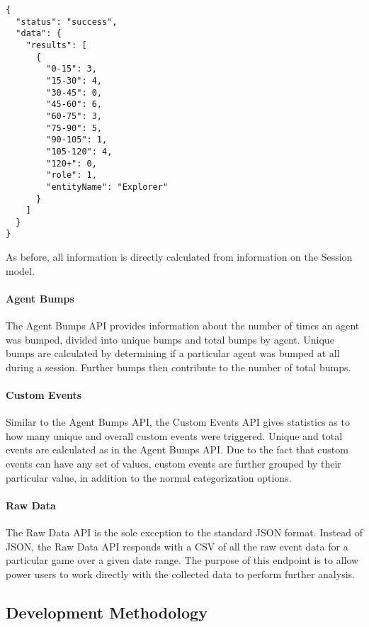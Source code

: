 \medskip
\begin{lstlisting}[caption=Gameplay Duration API response{,} showing the number of sessions that fell within certain ranges of gameplay time{,} categorized by the Explorer role, label={lst:duration_response}]
{
  "status": "success",
  "data": {
    "results": [
      {
        "0-15": 3,
        "15-30": 4,
        "30-45": 0,
        "45-60": 6,
        "60-75": 3,
        "75-90": 5,
        "90-105": 1,
        "105-120": 4,
        "120+": 0,
        "role": 1,
        "entityName": "Explorer"
      }
    ]
  }
}
\end{lstlisting}

As before, all information is directly calculated from information on the Session model.

\paragraph{Agent Bumps}

The Agent Bumps API provides information about the number of times an agent was bumped, divided into unique bumps and total bumps by agent. Unique bumps are calculated by determining if a particular agent was bumped at all during a session. Further bumps then contribute to the number of total bumps. 

\paragraph{Custom Events}

Similar to the Agent Bumps API, the Custom Events API gives statistics as to how many unique and overall custom events were triggered. Unique and total events are calculated as in the Agent Bumps API. Due to the fact that custom events can have any set of values, custom events are further grouped by their particular value, in addition to the normal categorization options.

\paragraph{Raw Data}

The Raw Data API is the sole exception to the standard JSON format. Instead of JSON, the Raw Data API responds with a CSV of all the raw event data for a particular game over a given date range. The purpose of this endpoint is to allow power users to work directly with the collected data to perform further analysis.


\subsection{Development Methodology}


